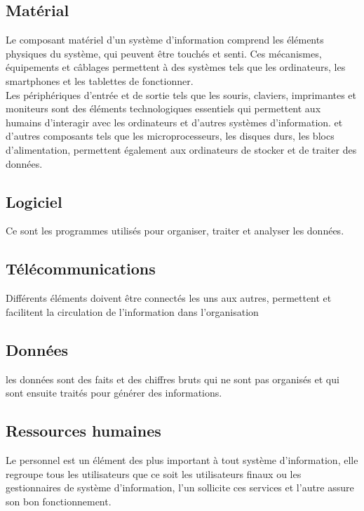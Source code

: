 \documentclass[12pt, letterpaper]{article}
\begin{document}
    \subsection{Matérial}
     Le composant matériel d'un système d'information comprend les 
     éléments physiques du système, qui peuvent être touchés et 
     senti. Ces mécanismes, équipements et câblages permettent à 
     des systèmes tels que les ordinateurs, les smartphones et les 
     tablettes de fonctionner.\\
     Les périphériques d'entrée et de sortie tels que les souris, 
     claviers, imprimantes et moniteurs sont des éléments 
     technologiques essentiels qui permettent aux humains d'interagir 
     avec les ordinateurs et d'autres systèmes d'information. et 
     d’autres composants tels que les microprocesseurs, les disques 
     durs, les blocs d'alimentation, permettent également aux 
     ordinateurs de stocker et de traiter des données.
     
     \subsection{Logiciel}
     Ce sont les programmes utilisés pour organiser, traiter et 
     analyser les données.
      
     \subsection{Télécommunications}
     Différents éléments doivent être connectés les uns aux autres, 
     permettent et facilitent la circulation de l’information dans 
     l’organisation
     
     \subsection{Données}
     les données sont des faits et des chiffres bruts qui ne sont pas 
     organisés et qui sont ensuite traités pour générer des informations.
     
     \subsection{Ressources humaines}
     Le personnel est un élément des plus important à tout système 
     d’information, elle regroupe tous les utilisateurs que ce soit les 
     utilisateurs finaux ou les gestionnaires de système d’information, 
     l’un sollicite ces services et l’autre assure son bon fonctionnement.
     
\end{document}
